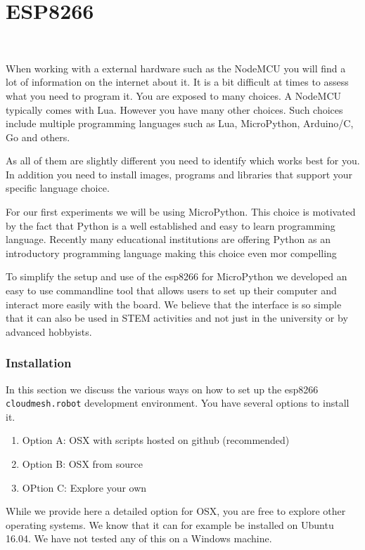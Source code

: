 \chapter{ESP8266}\label{esp8266}

\FILENAME\

When working with a external hardware such as the NodeMCU you will find
a lot of information on the internet about it. It is a bit difficult at
times to assess what you need to program it. You are exposed to many
choices. A NodeMCU typically comes with Lua. However you have many other
choices. Such choices include multiple programming languages such as
Lua, MicroPython, Arduino/C, Go and others.

As all of them are slightly different you need to identify which works
best for you. In addition you need to install images, programs and
libraries that support your specific language choice.

For our first experiments we will be using MicroPython. This choice is
motivated by the fact that Python is a well established and easy to
learn programming language. Recently many educational institutions are
offering Python as an introductory programming language making this
choice even mor compelling

To simplify the setup and use of the esp8266 for MicroPython we
developed an easy to use commandline tool that allows users to set up
their computer and interact more easily with the board. We believe that
the interface is so simple that it can also be used in STEM activities
and not just in the university or by advanced hobbyists.

\subsection{Installation}\label{installation}

In this section we discuss the various ways on how to set up the esp8266
\texttt{cloudmesh.robot} development environment. You have several
options to install it.

\begin{enumerate}
\item
  Option A: OSX with scripts hosted on github (recommended)
\item
  Option B: OSX from source
\item
  OPtion C: Explore your own
\end{enumerate}

While we provide here a detailed option for OSX, you are free to explore
other operating systems. We know that it can for example be installed on
Ubuntu 16.04. We have not tested any of this on a Windows machine.

